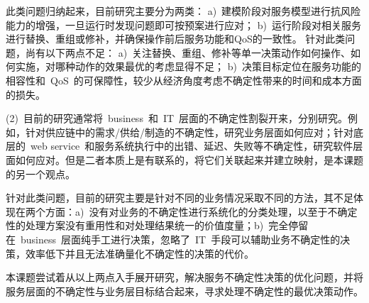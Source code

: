 此类问题归纳起来，目前研究主要分为两类：
a)~建模阶段对服务模型进行抗风险能力的增强，一旦运行时发现问题即可按预案进行应对；
b)~运行阶段对相关服务进行替换、重组或修补，并确保操作前后服务功能和QoS的一致性。
针对此类问题，尚有以下两点不足：
a)~关注替换、重组、修补等单一决策动作如何操作、如何实施，对哪种动作的效果最优的考虑显得不足；
b)~决策目标定位在服务功能的相容性和~QoS~的可保障性，较少从经济角度考虑不确定性带来的时间和成本方面的损失。

(2)~目前的研究通常将~business~和~IT~层面的不确定性割裂开来，分别研究。例如，针对供应链中的需求/供给/制造的不确定性，研究业务层面如何应对；针对底层的~web service~和服务系统执行中的出错、延迟、失败等不确定性，研究软件层面如何应对。但是二者本质上是有联系的，将它们关联起来并建立映射，是本课题的另一个观点。

针对此类问题，目前的研究主要是针对不同的业务情况采取不同的方法，其不足体现在两个方面：a)~没有对业务的不确定性进行系统化的分类处理，以至于不确定性的处理方案没有重用性和对处理结果统一的价值度量；b)~完全停留在~business~层面纯手工进行决策，忽略了~IT~手段可以辅助业务不确定性的决策，效率低下并且无法准确量化不确定性的决策的代价。

本课题尝试着从以上两点入手展开研究，解决服务不确定性决策的优化问题，并将服务层面的不确定性与业务层目标结合起来，寻求处理不确定性的最优决策动作。




